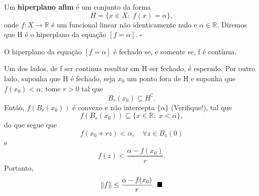 \documentclass[../functional_analysis.tex]{subfiles}
\begin{document}
\begin{def*}
	Um \textbf{hiperplano afim} é um conjunto da forma
	\[
		H=\{x\in X:\; f(x)=\alpha \},
	\]
	onde \(f:X\rightarrow \mathbb{R}\) é um funcional linear não identicamente nulo e \(\alpha \in \mathbb{R}.\) Diremos que H é o hiperplano da equação \([f=\alpha ].\; \square\)
\end{def*}

\begin{prop*}
	O hiperplano da equação \([f=\alpha ]\) é fechado se, e somente se, f é contínua.
\end{prop*}
\begin{proof*}
	Um dos lados, de f ser continua resultar em H ser fechado, é esperado. Por outro lado, suponha que H é fechado, seja \(x_{0}\) um ponto fora de H e suponha que \(f(x_{0})<\alpha \); tome \(r>0\) tal que
	\[
		B_r(x_{0})\subseteq H ^{\complement}.
	\]
	Então, \(f(B_r(x_{0}))\) é convexo e não intercepta \(\{\alpha \}\) (Verifique!), tal que
	\[
		f(B_r(x_{0}))\subseteq \{x\in \mathbb{R}:\; x<\alpha \},
	\]
	do que segue que
	\[
		f(x_{0}+rz)<\alpha , \quad \forall z\in B_1(0)
	\]
	e
	\[
		f(z)<\frac{\alpha -f(x_{0})}{r}.
	\]
	Portanto,
	\[
		\Vert f \Vert\leq \frac{\alpha - f(x_{0})}{r}. \text{ $\blacksquare$}
	\]
\end{proof*}
\end{document}
